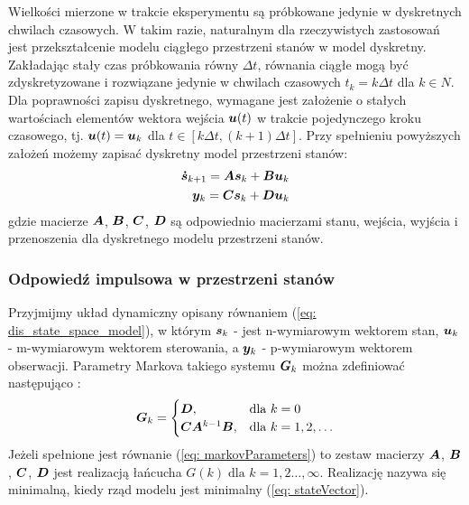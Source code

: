 Wielkości mierzone w trakcie eksperymentu są próbkowane jedynie w dyskretnych chwilach czasowych. W takim razie, naturalnym dla rzeczywistych zastosowań jest przekształcenie modelu ciągłego przestrzeni stanów w model dyskretny. Zakładając stały czas próbkowania równy $\Delta t$, równania ciągłe mogą być zdyskretyzowane i rozwiązane jedynie w chwilach czasowych $t_k=k\Delta t$ dla $k\in N$. Dla poprawności zapisu dyskretnego, wymagane jest założenie o stałych wartościach elementów wektora wejścia $\bm{u}(t)$ w trakcie pojedynczego kroku czasowego, tj. $\bm{u}(t)=\bm{u}_k$ dla $t \in [k\Delta t, (k+1)\Delta t]$. Przy spełnieniu powyższych założeń możemy zapisać dyskretny model przestrzeni stanów:
\begin{equation} \label{eq: dis_state_space_model}
	\begin{aligned}
		\bm{\dot{s}}_{k+1}= \bm{A}\bm{s}_k+\bm{B}\bm{u}_k \\
		\bm{y}_k = \bm{C}\bm{s}_k+\bm{D}\bm{u}_k
	\end{aligned}
\end{equation}
gdzie macierze $\bm{A}$, $\bm{B}$, $\bm{C}$, $\bm{D}$ są odpowiednio macierzami stanu, wejścia, wyjścia i przenoszenia dla dyskretnego modelu przestrzeni stanów.

\subsubsection{Odpowiedź impulsowa w przestrzeni stanów}
Przyjmijmy układ dynamiczny opisany równaniem (\ref{eq: dis_state_space_model}), w którym $\bm{s}_k$ - jest n-wymiarowym wektorem stan, $\bm{u}_k$ - m-wymiarowym wektorem sterowania, a $\bm{y}_k$ - p-wymiarowym wektorem obserwacji. Parametry Markova takiego systemu $\bm{G}_k$ można zdefiniować następująco \parencite{Schutter2000}:
\begin{equation} \label{eq: markovParameters}
	\bm{G}_k= \begin{cases}
		\bm{D}, & \text{dla }k=0 \\
		\bm{C}\bm{A}^{k-1}\bm{B}, & \text{dla }k=1,2, \dots
	\end{cases}
\end{equation}
Jeżeli spełnione jest równanie (\ref{eq: markovParameters}) to zestaw macierzy $\bm{A}$, $\bm{B}$, $\bm{C}$, $\bm{D}$ jest realizacją łańcucha $G(k)\; \text{dla } k=1,2\dots,\infty$. Realizację nazywa się minimalną, kiedy rząd modelu jest minimalny (\ref{eq: stateVector}).

